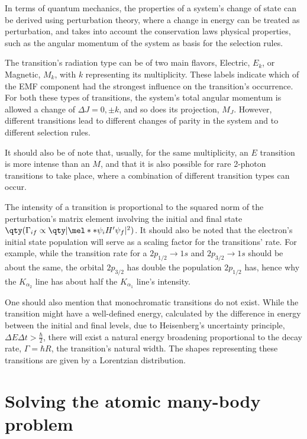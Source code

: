 In terms of quantum mechanics, the properties of a system's change of state can be derived using perturbation theory, where a change in energy can be treated as perturbation, and takes into account the conservation laws physical properties, such as the angular momentum of the system as basis for the selection rules.

The transition's radiation type can be of two main flavors, Electric, $E_k$, or Magnetic, $M_k$, with $k$ representing its multiplicity. These labels indicate which of the \gls{EMF} component had the strongest influence on the transition's occurrence.
For both these types of transitions, the system's total angular momentum is allowed a change of $\Delta J = 0, \pm k$, and so does its projection, $M_J$. However, different transitions lead to different changes of parity in the system and to different selection rules.

It should also be of note that, usually, for the same multiplicity, an $E$ transition is more intense than an $M$, and that it is also possible for rare 2-photon transitions to take place, where a combination of different transition types can occur.



The intensity of a transition is proportional to the squared norm of the perturbation's matrix element involving the initial and final state $\qty(\Gamma_{if}\propto \qty|\mel**{\psi_i}{H'}{\psi_f}|^2)$. It should also be noted that the electron's initial state population will serve as a scaling factor for the transitions' rate.
For example, while the transition rate for a $2p_{1/2}\rightarrow1s$ and $2p_{3/2}\rightarrow1s$ should be about the same, the orbital $2p_{3/2}$ has double the population $2p_{1/2}$ has, hence why the $K_{\alpha_2}$ line has about half the $K_{\alpha_1}$ line's intensity.

One should also mention that monochromatic transitions do not exist. While the transition might have a well-defined energy, calculated by the difference in energy between the initial and final levels, due to Heisenberg's uncertainty principle, $\Delta E \Delta t > \frac{\hbar}{2}$, there will exist a natural energy broadening proportional to the decay rate, $\Gamma=\hbar R$, the transition's natural width. The shapes representing these transitions are given by a Lorentzian distribution.




\section{Solving the atomic many-body problem}


